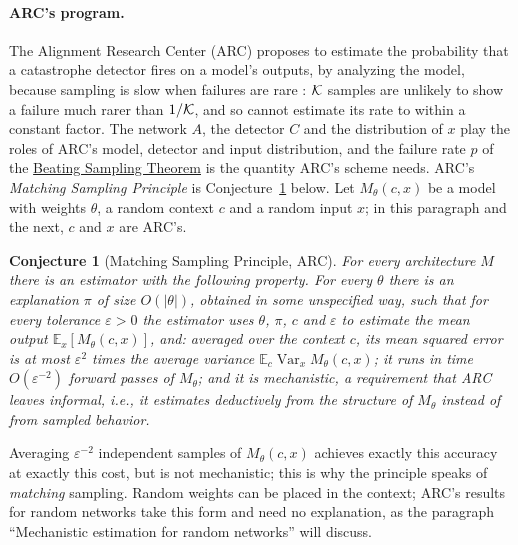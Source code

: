 \documentclass[10pt]{article}
\newcommand{\bst}{\hyperref[thm:main]{Beating Sampling Theorem}}
\newtheorem{conjecture}{Conjecture}
\newcommand{\EE}{\mathbb{E}}
\begin{document}
\paragraph{ARC's program.}
The Alignment Research Center (ARC) proposes to estimate the probability that
a catastrophe detector fires on a model's outputs, by analyzing the model,
because sampling is slow when failures are rare
\citep{arc-2025-competing,arc-2026-mikes-eye}: $\mathcal{K}$ samples are unlikely to
show a failure much rarer than $1/\mathcal{K}$, and so cannot estimate its rate to
within a constant factor. The network $A$, the detector $C$ and the distribution of $x$ play the
roles of ARC's model, detector and input distribution, and the failure rate
$p$ of the \bst{} is the quantity ARC's scheme needs. ARC's
\emph{Matching Sampling Principle} is Conjecture~\ref{conj:msp} below. Let
$M_\theta(c,x)$ be a model with weights $\theta$, a random context $c$ and a
random input $x$; in this paragraph and the next, $c$ and $x$ are ARC's.
\begin{conjecture}[Matching Sampling Principle, ARC]\label{conj:msp}
For every architecture $M$ there is an estimator with the following
property. For every $\theta$ there is an explanation $\pi$ of size
$O(|\theta|)$, obtained in some unspecified way, such that for every
tolerance $\varepsilon>0$ the estimator uses $\theta$, $\pi$, $c$ and
$\varepsilon$ to estimate the mean output $\EE_x[M_\theta(c,x)]$, and:
averaged over the context $c$, its mean squared error is at most
$\varepsilon^2$ times the average variance $\EE_c\operatorname{Var}_x
M_\theta(c,x)$; it runs in time $O(\varepsilon^{-2})$ forward passes of
$M_\theta$; and it is \emph{mechanistic}, a requirement that ARC leaves
informal, i.e., it estimates deductively from the structure of $M_\theta$
instead of from sampled behavior.
\end{conjecture}
Averaging $\varepsilon^{-2}$ independent samples of
$M_\theta(c,x)$ achieves exactly this accuracy at exactly this cost, but is
not mechanistic; this is why the principle speaks of \emph{matching} sampling. Random weights can be
placed in the context; ARC's results for random networks take this form and
need no explanation, as the paragraph ``Mechanistic estimation for random
networks'' will discuss.
\end{document}
